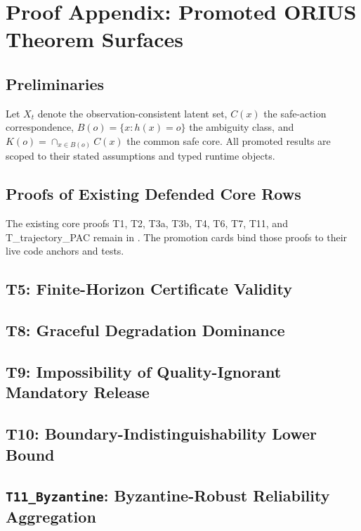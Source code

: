 \chapter{Proof Appendix: Promoted ORIUS Theorem Surfaces}
\label{app:proof-appendix}

\section{Preliminaries}
Let \(X_t\) denote the observation-consistent latent set, \(C(x)\) the
safe-action correspondence, \(B(o)=\{x:h(x)=o\}\) the ambiguity class, and
\(K(o)=\cap_{x\in B(o)}C(x)\) the common safe core.  All promoted results are
scoped to their stated assumptions and typed runtime objects.

\section{Proofs of Existing Defended Core Rows}
The existing core proofs T1, T2, T3a, T3b, T4, T6, T7, T11, and
T\_trajectory\_PAC remain in .  The
promotion cards bind those proofs to their live code anchors and tests.

\section{T5: Finite-Horizon Certificate Validity}


\section{T8: Graceful Degradation Dominance}


\section{T9: Impossibility of Quality-Ignorant Mandatory Release}


\section{T10: Boundary-Indistinguishability Lower Bound}


\section{\texttt{T11\_Byzantine}: Byzantine-Robust Reliability Aggregation}


